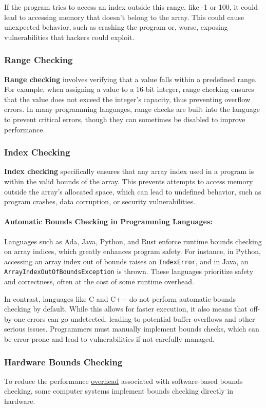 \documentclass{book}
\begin{document}
If the program tries to access an index outside this range, like -1 or 100, it could lead to accessing memory that doesn't belong to the array. This could cause unexpected behavior, such as crashing the program or, worse, exposing vulnerabilities that hackers could exploit.

\subsubsection{Range Checking}
\textbf{Range checking} involves verifying that a value falls within a predefined range. For example, when assigning a value to a 16-bit integer, range checking ensures that the value does not exceed the integer's capacity, thus preventing overflow errors. In many programming languages, range checks are built into the language to prevent critical errors, though they can sometimes be disabled to improve performance.

\subsubsection{Index Checking}
\textbf{Index checking} specifically ensures that any array index used in a program is within the valid bounds of the array. This prevents attempts to access memory outside the array’s allocated space, which can lead to undefined behavior, such as program crashes, data corruption, or security vulnerabilities.

\paragraph{Automatic Bounds Checking in Programming Languages:}
Languages such as Ada, Java, Python, and Rust enforce runtime bounds checking on array indices, which greatly enhances program safety. For instance, in Python, accessing an array index out of bounds raises an \texttt{IndexError}, and in Java, an \texttt{ArrayIndexOutOfBoundsException} is thrown. These languages prioritize safety and correctness, often at the cost of some runtime overhead.

In contrast, languages like C and C++ do not perform automatic bounds checking by default. While this allows for faster execution, it also means that off-by-one errors can go undetected, leading to potential buffer overflows and other serious issues. Programmers must manually implement bounds checks, which can be error-prone and lead to vulnerabilities if not carefully managed.

\subsubsection{Hardware Bounds Checking}
To reduce the performance \href{https://en.wikipedia.org/wiki/Overhead_(computing)}{overhead} associated with software-based bounds checking, some computer systems implement bounds checking directly in hardware. 
\end{document}
